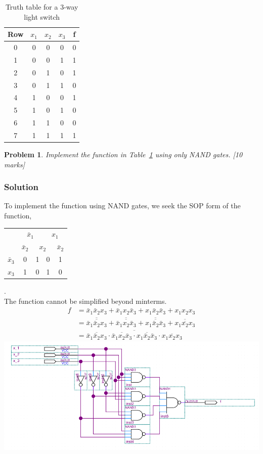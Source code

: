 \documentclass[twocolumn]{article}
\newtheorem{prob}{Problem}
\newcommand{\bx}{\bar{x}}
\begin{document}
\begin{table}
  \centering
  \begin{tabular}{c|ccc||c}
    \toprule
    Row & $x_1$ & $x_2$ & $x_3$ & f \\
    \midrule
    0 & 0 & 0 & 0 & 0 \\
    1 & 0 & 0 & 1 & 1 \\
    2 & 0 & 1 & 0 & 1 \\
    3 & 0 & 1 & 1 & 0 \\
    4 & 1 & 0 & 0 & 1 \\
    5 & 1 & 0 & 1 & 0 \\
    6 & 1 & 1 & 0 & 0 \\
    7 & 1 & 1 & 1 & 1 \\
    \bottomrule
    \end{tabular}
    \caption{Truth table for a 3-way light switch}
    \label{tab:3-way-light-switch}
\end{table}

\begin{prob}
 Implement the function in Table~\ref{tab:3-way-light-switch} using only NAND
 gates. [10 marks]
\end{prob}
\subsubsection*{Solution}
To implement the function using NAND gates, we seek the SOP form of the
function,
\\
\begin{tabular}{c|c|c|c|c}
  \toprule
  & \multicolumn{2}{c|}{$\bx_1$} & \multicolumn{2}{c}{$x_1$}
  \\
  & $\bx_2$ & \multicolumn{2}{c|}{$x_2$} & $\bx_2$
  \\ \midrule
  $\bx_3$
  & 0 & 1 & 0 & 1
  \\
  $x_3$
  & 1 & 0 & 1 & 0
  \\\bottomrule
\end{tabular}.
\\
The function cannot be simplified beyond minterms.
\begin{align*}
  f &= \bx_1 \bx_2 x_3 + \bx_1 x_2 \bx_3 + x_1 \bx_2 \bx_3 + x_1 x_2 x_3
  \\
    &= \overline{\overline{\bx_1 \bx_2 x_3}} + \overline{\overline{\bx_1 x_2 \bx_3}} + \overline{\overline{x_1 \bx_2 \bx_3}} + \overline{\overline{x_1 x_2 x_3}}
  \\
    &= \overline{\overline{\bx_1 \bx_2 x_3} \cdot {\overline{\bx_1 x_2 \bx_3}} \cdot {\overline{x_1 \bx_2 \bx_3}} \cdot {\overline{x_1 x_2 x_3}}}
\end{align*}
\includegraphics[width=\linewidth]{files/hw2p3.png}
\end{document}
